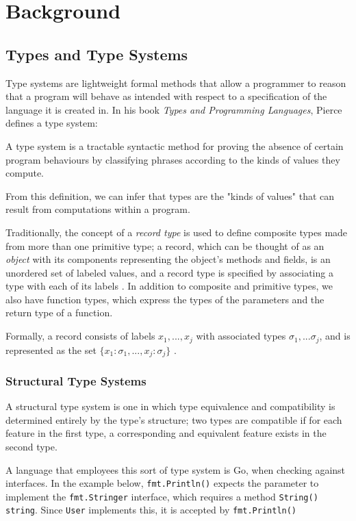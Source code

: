 \chapter{Background}

\section{Types and Type Systems}

Type systems are lightweight formal methods that allow a programmer to reason that a program will behave as intended with respect to a specification of the language it is created in. In his book \textit{Types and Programming Languages}\cite{PierceBenjaminC2002Tapl}, Pierce defines a type system:
\begin{displayquote}
A type system is a tractable syntactic method for proving the absence of certain program behaviours by classifying phrases according to the kinds of values they compute.
\end{displayquote}
From this definition, we can infer that types are the "kinds of values" that can result from computations within a program.

Traditionally, the concept of a \textit{record type} is used to define composite types made from more than one primitive type; a record, which can be thought of as an \textit{object} with its components representing the object's methods and fields, is an unordered set of labeled values, and a record type is specified by associating a type with each of its labels \cite{Cardelli1985}. In addition to composite and primitive types, we also have function types, which express the types of the parameters and the return type of a function.

Formally, a record consists of labels $x_1, ..., x_j$ with associated types $\sigma_1, ... \sigma_j$, and is represented as the set $\{x_1:\sigma_1, ..., x_j:\sigma_j\}$ \cite{Canning1989}.

\subsection{Structural Type Systems}

A structural type system is one in which type equivalence and compatibility is determined entirely by the type's structure; two types are compatible if for each feature in the first type, a corresponding and equivalent feature exists in the second type.

A language that employees this sort of type system is Go, when checking against interfaces. In the example below, \texttt{fmt.Println()} expects the parameter to implement the \texttt{fmt.Stringer} interface, which requires a method \texttt{String() string}. Since \texttt{User} implements this, it is accepted by \texttt{fmt.Println()}

